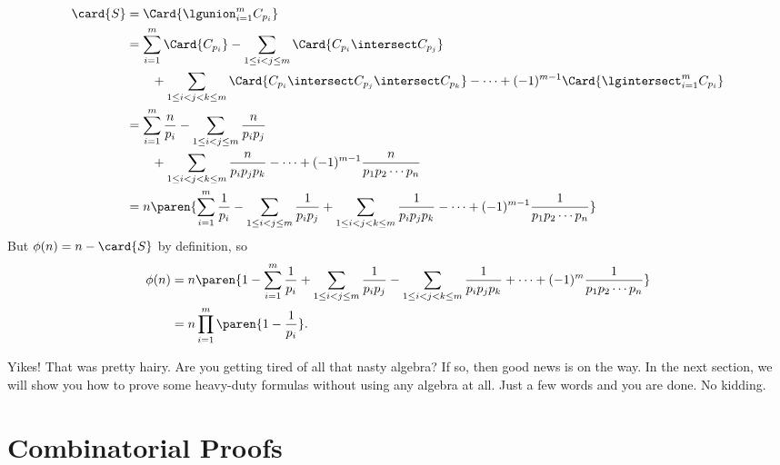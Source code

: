 \begin{align*}
\card{S}
  & = \Card{\lgunion_{i=1}^m C_{p_i}}\\
  & = \sum_{i=1}^m \Card{C_{p_i}} - \sum_{1\leq i < j \leq m} \Card{C_{p_i} \intersect C_{p_j}}\\
  &\qquad  + \sum_{1\leq i < j < k \leq m} \Card{C_{p_i} \intersect C_{p_j} \intersect C_{p_k}} -
       \cdots + (-1)^{m-1} \Card{\lgintersect_{i=1}^m C_{p_i}}\\
  & = \sum_{i=1}^m \frac{n}{p_i} -
      \sum_{1\leq i < j \leq m} \frac{n}{p_ip_j}\\
  &\qquad  + \sum_{1\leq i < j < k \leq m} \frac{n}{p_ip_jp_k} -
       \cdots + (-1)^{m-1} \frac{n}{p_1p_2\cdots p_n}\\
  & = n\paren{\sum_{i=1}^m \frac{1}{p_i} -
      \sum_{1\leq i < j \leq m} \frac{1}{p_ip_j}
       + \sum_{1\leq i < j < k \leq m} \frac{1}{p_ip_jp_k} - \cdots
        + (-1)^{m-1} \frac{1}{p_1p_2\cdots p_n}}
\end{align*}
But $\phi(n)=n-\card{S}$ by definition, so
\begin{align}
  \phi(n) & = n\paren{1 - \sum_{i=1}^m \frac{1}{p_i} +  \sum_{1\leq i < j \leq m} \frac{1}{p_ip_j}
    - \sum_{1\leq i < j < k \leq m} \frac{1}{p_ip_jp_k} + \cdots
    + (-1)^m\frac{1}{p_1p_2\cdots p_n}}\notag\\
          &  = n \prod_{i=1}^m \paren{1 - \frac{1}{p_i}}.\label{inex-phi}
\end{align}

Yikes!  That was pretty hairy.  Are you getting tired of all that
nasty algebra?  If so, then good news is on the way.  In the next
section, we will show you how to prove some heavy-duty formulas
without using any algebra at all.  Just a few words and you are done.
No kidding.

\begin{problems}
\practiceproblems
{}

\classproblems
{}

\homeworkproblems
{}

\examproblems
{}

\end{problems}


\section{Combinatorial Proofs}\label{combinatorial_proof_sec}

